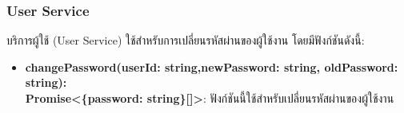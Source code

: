 \subsubsection{User Service}
\ifenglish
\else
บริการผู้ใช้ (User Service) ใช้สำหรับการเปลี่ยนรหัสผ่านของผู้ใช้งาน โดยมีฟังก์ชันดังนี้:
\begin{itemize}
    \item \textbf{changePassword(userId: string,newPassword: string, oldPassword: string): \\ Promise<\{password: string\}[]>}: ฟังก์ชันนี้ใช้สำหรับเปลี่ยนรหัสผ่านของผู้ใช้งาน
\end{itemize}
\fi

\clearpage